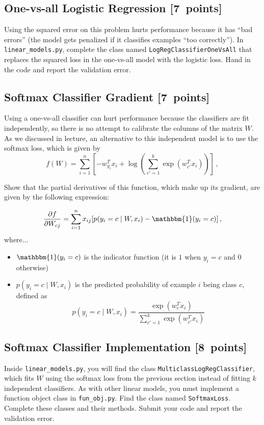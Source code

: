 \documentclass{article}
\newcommand{\blu}[1]{{\textcolor{blu}{#1}}}
\let\ask\blu
\newcommand\pts[1]{\textcolor{pointscolour}{[#1~points]}}
\begin{document}
\subsection{One-vs-all Logistic Regression \pts{7}}

Using the squared error on this problem hurts performance because it has ``bad errors'' (the model gets penalized if it classifies examples ``too correctly''). In \verb|linear_models.py|, complete the class named \verb|LogRegClassifierOneVsAll| that replaces the squared loss in the one-vs-all model with the logistic loss. \ask{Hand in the code and report the validation error}.



\subsection{Softmax Classifier Gradient \pts{7}}

Using a one-vs-all classifier can hurt performance because the classifiers are fit independently, so there is no attempt to calibrate the columns of the matrix $W$. As we discussed in lecture, an alternative to this independent model is to use the softmax loss, which is given by
\[
f(W) = \sum_{i=1}^n \left[-w_{y_i}^Tx_i + \log\left(\sum_{c' = 1}^k \exp(w_{c'}^Tx_i)\right)\right] \, ,
\]

\ask{Show that the partial derivatives of this function, which make up its gradient, are given by the following expression:}

\[
\frac{\partial f}{\partial W_{cj}} = \sum_{i=1}^n x_{ij}[p(y_i=c \mid W,x_i) - \mathbbm{1}(y_i = c)] \, ,
\]
where...
\begin{itemize}
\item $\mathbbm{1}(y_i = c)$ is the indicator function (it is $1$ when $y_i=c$ and $0$ otherwise)
\item $p(y_i=c \mid W, x_i)$ is the predicted probability of example $i$ being class $c$, defined as
\[
p(y_i=c \mid W, x_i) = \frac{\exp(w_c^Tx_i)}{\sum_{c'=1}^k\exp(w_{c'}^Tx_i)}
\]


\end{itemize}

\subsection{Softmax Classifier Implementation \pts{8}}

Inside \verb|linear_models.py|, you will find the class \verb|MulticlassLogRegClassifier|, which fits $W$ using the softmax loss from the previous section instead of fitting $k$ independent classifiers. As with other linear models, you must implement a function object class in \verb|fun_obj.py|. Find the class named \verb|SoftmaxLoss|. Complete these classes and their methods. \ask{Submit your code and report the validation error.}
\end{document}
